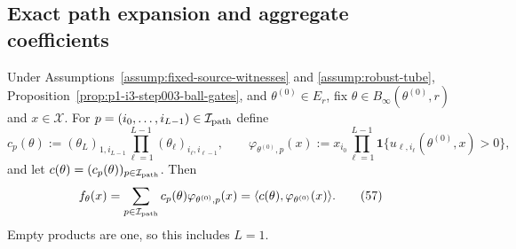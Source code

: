 \subsection{Exact path expansion and aggregate coefficients}
\label{app:step004-paths}

\begin{lemma}
\label{lem:p1-i3-step004-path-expansion}
Under Assumptions~\ref{assump:fixed-source-witnesses} and
\ref{assump:robust-tube}, Proposition~\ref{prop:p1-i3-step003-ball-gates},
and $\theta^{(0)}\in E_r$, fix
$\theta\in B_\infty(\theta^{(0)},r)$ and $x\in\mathcal X$.  For
$p=(i_0,\ldots,i_{L-1})\in\mathcal I_{\rm path}$ define
\[
c_p(\theta):=(\theta_L)_{1,i_{L-1}}
\prod_{\ell=1}^{L-1}(\theta_\ell)_{i_\ell,i_{\ell-1}},
\qquad
\varphi_{\theta^{(0)},p}(x):=x_{i_0}
\prod_{\ell=1}^{L-1}
\mathbf1\{u_{\ell,i_\ell}(\theta^{(0)},x)>0\},
\tag{56}
\]
and let $c(\theta)=(c_p(\theta))_{p\in\mathcal I_{\rm path}}$.  Then
\[
f_\theta(x)=\sum_{p\in\mathcal I_{\rm path}}c_p(\theta)
\varphi_{\theta^{(0)},p}(x)
=\langle c(\theta),\varphi_{\theta^{(0)}}(x)\rangle.
\tag{57}
\]
Empty products are one, so this includes $L=1$.
\end{lemma}

